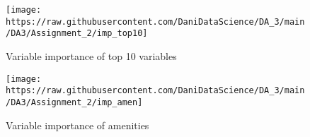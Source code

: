 \documentclass[
]{article}
\begin{document}
\begin{figure}

{\centering \texttt{[image: https://raw.githubusercontent.com/DaniDataScience/DA\_3/main/DA3/Assignment\_2/imp\_top10]} 

}

\caption{Variable importance of top 10 variables}\label{fig:unnamed-chunk-10}
\end{figure}

\begin{figure}

{\centering \texttt{[image: https://raw.githubusercontent.com/DaniDataScience/DA\_3/main/DA3/Assignment\_2/imp\_amen]} 

}

\caption{Variable importance of amenities}\label{fig:unnamed-chunk-11}
\end{figure}
\end{document}
